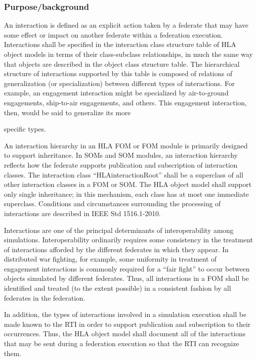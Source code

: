 \subsubsection{Purpose/background}
An interaction is defined as an explicit action taken by a federate that may have some effect or impact on another federate within a federation execution. Interactions shall be specified in the interaction class structure table of HLA object models in terms of their class-subclass relationships, in much the same way that objects are described in the object class structure table. The hierarchical structure of interactions supported by this table is composed of relations of generalization (or specialization) between different types of interactions. For example, an engagement interaction might be specialized by air-to-ground engagements, ship-to-air engagements, and others. This engagement interaction, then, would be said to generalize its more

\newpage
specific types.

An interaction hierarchy in an HLA FOM or FOM module is primarily designed to support inheritance. In SOMs and SOM modules, an interaction hierarchy reflects how the federate supports publication and subscription of interaction classes. The interaction class ``HLAinteractionRoot'' shall be a superclass of all other interaction classes in a FOM or SOM. The HLA object model shall support only single inheritance; in this mechanism, each class has at most one immediate superclass. Conditions and circumstances surrounding the processing of interactions are described in IEEE Std 1516.1-2010.

Interactions are one of the principal determinants of interoperability among simulations. Interoperability ordinarily requires some consistency in the treatment of interactions afforded by the different federates in which they appear. In distributed war fighting, for example, some uniformity in treatment of engagement interactions is commonly required for a ``fair fight'' to occur between objects simulated by different federates. Thus, all interactions in a FOM shall be identified and treated (to the extent possible) in a consistent fashion by all federates in the federation.

In addition, the types of interactions involved in a simulation execution shall be made known to the RTI in order to support publication and subscription to their occurrences. Thus, the HLA object model shall document all of the interactions that may be sent during a federation execution so that the RTI can recognize them.

